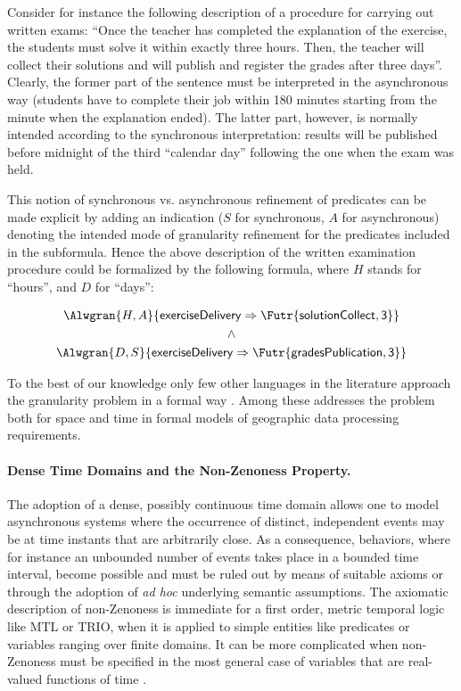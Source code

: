 Consider for instance the following description of a procedure for
carrying out written exams: ``Once the teacher has completed the
explanation of the exercise, the students must solve it within exactly
three hours. Then, the teacher will collect their solutions and will
publish and register the grades after three days''. Clearly, the
former part of the sentence must be interpreted in the asynchronous
way (students have to complete their job within 180 minutes starting
from the minute when the explanation ended). The latter part, however,
is normally intended according to the synchronous interpretation:
results will be published before midnight of the third ``calendar
day'' following the one when the exam was held.

This notion of synchronous vs. asynchronous refinement of predicates
can be made explicit by adding an indication ($S$ for
synchronous, $A$ for asynchronous) denoting the intended mode
of granularity refinement for the predicates included in the
subformula. Hence the above description of the written examination
procedure could be formalized by the following formula, where
$H$ stands for ``hours'', and $D$ for ``days'':

\begin{gather*}
\Alwgran{H,A}{\mathsf{exerciseDelivery} \Rightarrow \Futr{\mathsf{solutionCollect, 3}}} \\
\wedge \\
\Alwgran{D,S}{\mathsf{exerciseDelivery} \Rightarrow \Futr{\mathsf{gradesPublication, 3}}}
\end{gather*}

To the best of our knowledge only few other languages in the
literature approach the granularity problem in a formal way
\cite{BB06,Rom90}. Among these \cite{Rom90} addresses the problem both
for space and time in formal models of geographic data processing
requirements.




\paragraph{Dense Time Domains and the Non-Zenoness Property.}
The adoption of a dense, possibly continuous time domain allows 
one to model asynchronous systems where the occurrence of distinct, 
independent events may be at time instants that are arbitrarily 
close. As a consequence,  behaviors, where for instance an 
unbounded number of events takes place in a bounded time interval, 
become possible and must be ruled out by means of suitable axioms 
or through the adoption of \emph{ad hoc} underlying semantic assumptions. 
The axiomatic description of non-Zenoness is immediate for a 
first order, metric temporal logic like MTL or TRIO, when it is applied 
to simple entities like predicates or variables ranging over 
finite domains. It can be more complicated when non-Zenoness 
must be specified in the most general case of variables that 
are real-valued functions of time \cite{GM01}.

